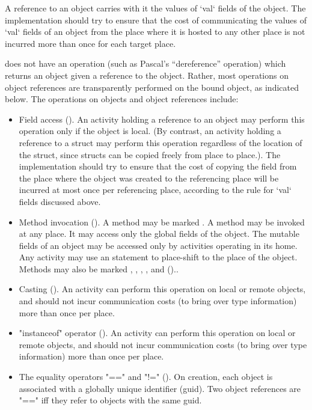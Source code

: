 A reference to an object carries with it the values of   \xcd`val`
fields
of the object. The implementation should try to ensure that the cost
of communicating the values of \xcd`val` fields of an object from the
place where it is hosted to any other place is not incurred more than
once for each target place.

{}\Xten{} does not have an operation (such as Pascal's ``dereference''
operation) which returns an object given a reference to the
object. Rather, most operations on object references are transparently
performed on the bound object, as indicated below. The operations on
objects and object references include:
\begin{itemize}

{}\item Field access (). An activity holding a
reference to an object may perform this operation only if the
object is local.  (By contrast, an activity holding a reference to a struct
may perform this operation regardless of the location of the struct, 
since structs can be copied freely from place to place.).  The
implementation should try to ensure that the cost of copying the field
from the place where the object was created to the referencing place
will be incurred at most once per referencing place, according to the
rule for \xcd`val` fields discussed above.

{}\item Method invocation ().  A method may be
marked . A  method may be invoked at any
place. It may access only the global fields of the object. The
mutable fields of an object may be accessed only by activities
operating in its home.  Any activity may use an  statement
to place-shift to the place of the object. Methods may also be
marked , , ,
, and  ()..

{}\item Casting ().  An activity can perform this
operation on local or remote objects, and should not incur
communication costs (to bring over type information) more than once
per place.

{}\item \xcd"instanceof" operator ().  An activity
can perform this operation on local or remote objects, and should not
incur communication costs (to bring over type information) more than
once per place.

\item The equality operators \xcd"==" and \xcd"!="
(). On creation, each object is associated with a globally
unique identifier (guid). Two object references are \xcd"==" iff they refer to objects
with the  same guid.

\end{itemize}

